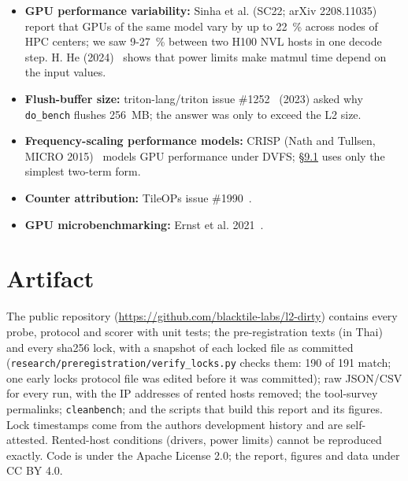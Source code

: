 \documentclass[11pt,a4paper]{article}
\begin{document}
\begin{itemize}
  clocks with \texttt{nvidia-smi\ -lgc}, and CUDA graphs; it flushes by writing an L2-sized buffer. FlashInfer\textquotesingle s
  \texttt{bench\_\allowbreak{}gpu\_\allowbreak{}time\_\allowbreak{}with\_\allowbreak{}cupti}~\cite{flashinfer} reads kernel durations from CUPTI; Triton\textquotesingle s \texttt{testing.set\_\allowbreak{}gpu\_\allowbreak{}clock} locks clocks; nvbench
  detects throttling. We do not claim these techniques; \hyperref[kernel-by-kernel-does-a-single-kernel-benchmark-match-the-same-kernel-inside-the-decode-proxy]{\S{}9.1} measures which of them are needed, and how far each one
  gets, against the kernel\textquotesingle s time inside a model.
\item
  \textbf{GPU performance variability:} Sinha et al. (SC22; arXiv 2208.11035)~\cite{sinha} report that GPUs of the same model vary by
  up to 22~\% across nodes of HPC centers; we saw 9-27~\% between two H100 NVL hosts in one decode step. H. He (2024)~\cite{he} shows that power
  limits make matmul time depend on the input values.
\item
  \textbf{Flush-buffer size:} triton-lang/triton issue \#1252~\cite{tr1252} (2023) asked why \texttt{do\_\allowbreak{}bench} flushes 256~MB; the answer was
  only to exceed the L2 size.
\item
  \textbf{Frequency-scaling performance models:} CRISP (Nath and Tullsen, MICRO 2015)~\cite{crisp} models GPU performance under DVFS;
  \hyperref[kernel-by-kernel-does-a-single-kernel-benchmark-match-the-same-kernel-inside-the-decode-proxy]{\S{}9.1} uses only the simplest two-term form.
\item
  \textbf{Counter attribution:} TileOPs issue \#1990~\cite{tileops1990}.
\item
  \textbf{GPU microbenchmarking:} Ernst et al. 2021~\cite{ernst}.
\end{itemize}

\section*{Artifact}\label{artifact}

The public repository (\url{https://github.com/blacktile-labs/l2-dirty}) contains every probe, protocol and scorer with unit tests; the
pre-registration texts (in Thai) and every sha256 lock, with a snapshot of each locked file as committed
(\texttt{research/preregistration/verify\_\allowbreak{}locks.py} checks them: 190 of 191 match; one early lock\textquotesingle s protocol file was edited
before it was committed); raw JSON/CSV for every run, with the IP addresses of rented hosts removed; the tool-survey
permalinks; \texttt{cleanbench}; and the scripts that build this report and its figures. Lock timestamps come from the
authors\textquotesingle{} development history and are self-attested. Rented-host conditions (drivers, power limits) cannot be
reproduced exactly. Code is under the Apache License 2.0; the report, figures and data under CC BY 4.0.
\end{document}

